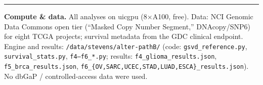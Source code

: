 \documentclass[11pt]{article}
\begin{document}
\vspace{1em}
\hrule
\vspace{0.5em}
{\footnotesize
\textbf{Compute \& data.} All analyses on uicgpu (8$\times$A100, free).
Data: NCI Genomic Data Commons open tier (``Masked Copy Number Segment,''
DNAcopy/SNP6) for eight TCGA projects; survival metadata from the GDC clinical
endpoint. Engine and results:
\texttt{/data/stevens/alter-pathB/} (code: \texttt{gsvd\_reference.py},
\texttt{survival\_stats.py}, \texttt{f4--f6\_*.py}; results:
\texttt{f4\_glioma\_results.json}, \texttt{f5\_brca\_results.json},
\texttt{f6\_\{OV,SARC,UCEC,STAD,LUAD,ESCA\}\_results.json}). No dbGaP /
controlled-access data were used.}
\end{document}
